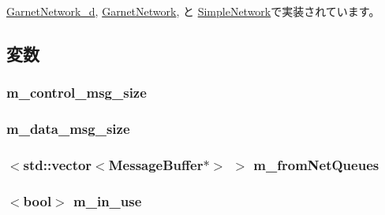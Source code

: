 \hyperlink{classGarnetNetwork__d_ac55fe386a101fbae38c716067c9966a0}{GarnetNetwork\_\-d}, \hyperlink{classGarnetNetwork_ac55fe386a101fbae38c716067c9966a0}{GarnetNetwork}, と \hyperlink{classSimpleNetwork_ac55fe386a101fbae38c716067c9966a0}{SimpleNetwork}で実装されています。

\subsection{変数}
\hypertarget{classNetwork_aac98080a2a3db1805c4d49d34e075faa}{
\subsubsection[{m\_\-control\_\-msg\_\-size}]{ {\bf m\_\-control\_\-msg\_\-size}}}
\label{classNetwork_aac98080a2a3db1805c4d49d34e075faa}
\hypertarget{classNetwork_a73dbc7ca576dcb0d534f4f65f3e3a25b}{
\subsubsection[{m\_\-data\_\-msg\_\-size}]{ {\bf m\_\-data\_\-msg\_\-size}}}
\label{classNetwork_a73dbc7ca576dcb0d534f4f65f3e3a25b}
\hypertarget{classNetwork_a27af683e8bb4ba58e5c79a3e969cfe8a}{
\subsubsection[{m\_\-fromNetQueues}]{$<${\bf std::vector}$<${\bf MessageBuffer}$\ast$$>$ $>$ {\bf m\_\-fromNetQueues}}}
\label{classNetwork_a27af683e8bb4ba58e5c79a3e969cfe8a}
\hypertarget{classNetwork_a5d6a051ce5268f65e8e97c963457fdad}{
\subsubsection[{m\_\-in\_\-use}]{$<$bool$>$ {\bf m\_\-in\_\-use}}}
